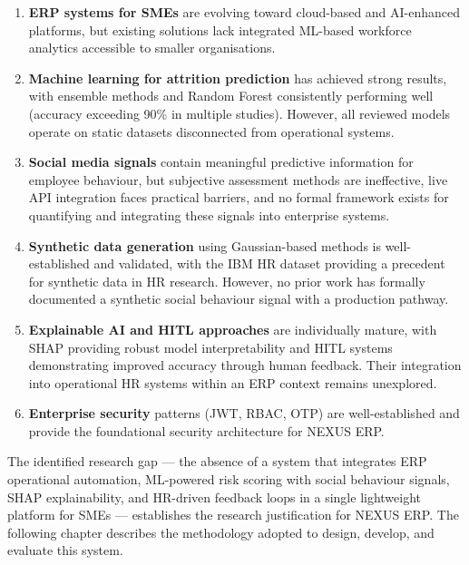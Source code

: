 \documentclass[12pt,a4paper]{article}
\begin{document}
\begin{enumerate}[leftmargin=2em]
    \item \textbf{ERP systems for SMEs} are evolving toward cloud-based and AI-enhanced platforms, but existing solutions lack integrated ML-based workforce analytics accessible to smaller organisations.

    \item \textbf{Machine learning for attrition prediction} has achieved strong results, with ensemble methods and Random Forest consistently performing well (accuracy exceeding 90\% in multiple studies). However, all reviewed models operate on static datasets disconnected from operational systems.

    \item \textbf{Social media signals} contain meaningful predictive information for employee behaviour, but subjective assessment methods are ineffective, live API integration faces practical barriers, and no formal framework exists for quantifying and integrating these signals into enterprise systems.

    \item \textbf{Synthetic data generation} using Gaussian-based methods is well-established and validated, with the IBM HR dataset providing a precedent for synthetic data in HR research. However, no prior work has formally documented a synthetic social behaviour signal with a production pathway.

    \item \textbf{Explainable AI and HITL approaches} are individually mature, with SHAP providing robust model interpretability and HITL systems demonstrating improved accuracy through human feedback. Their integration into operational HR systems within an ERP context remains unexplored.

    \item \textbf{Enterprise security} patterns (JWT, RBAC, OTP) are well-established and provide the foundational security architecture for NEXUS ERP.
\end{enumerate}

The identified research gap --- the absence of a system that integrates ERP operational automation, ML-powered risk scoring with social behaviour signals, SHAP explainability, and HR-driven feedback loops in a single lightweight platform for SMEs --- establishes the research justification for NEXUS ERP. The following chapter describes the methodology adopted to design, develop, and evaluate this system.

\newpage


\end{document}
